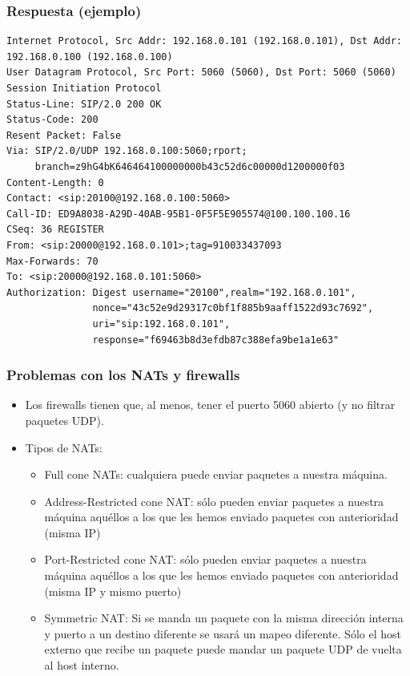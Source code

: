 \documentclass{beamer}
\begin{document}
\begin{frame}[fragile]
\frametitle{Respuesta (ejemplo)}

\begin{footnotesize}
\begin{verbatim}
Internet Protocol, Src Addr: 192.168.0.101 (192.168.0.101), Dst Addr:
192.168.0.100 (192.168.0.100)
User Datagram Protocol, Src Port: 5060 (5060), Dst Port: 5060 (5060)
Session Initiation Protocol
Status-Line: SIP/2.0 200 OK
Status-Code: 200
Resent Packet: False
Via: SIP/2.0/UDP 192.168.0.100:5060;rport;
     branch=z9hG4bK646464100000000b43c52d6c00000d1200000f03
Content-Length: 0
Contact: <sip:20100@192.168.0.100:5060>
Call-ID: ED9A8038-A29D-40AB-95B1-0F5F5E905574@100.100.100.16
CSeq: 36 REGISTER
From: <sip:20000@192.168.0.101>;tag=910033437093
Max-Forwards: 70
To: <sip:20000@192.168.0.101:5060>
Authorization: Digest username="20100",realm="192.168.0.101",
               nonce="43c52e9d29317c0bf1f885b9aaff1522d93c7692",
               uri="sip:192.168.0.101",
               response="f69463b8d3efdb87c388efa9be1a1e63"

\end{verbatim}
\end{footnotesize}

\end{frame}



\begin{frame}
\frametitle{Problemas con los NATs y firewalls}

\begin{itemize}
\item Los firewalls tienen que, al menos, tener el puerto 5060 abierto (y no filtrar paquetes UDP).
\item Tipos de NATs:
\begin{itemize}
  \item Full cone NATs: cualquiera puede enviar paquetes a nuestra máquina.
  \item Address-Restricted cone NAT: sólo pueden enviar paquetes a nuestra máquina aquéllos a los que les hemos enviado paquetes con anterioridad (misma IP)
  \item Port-Restricted cone NAT: sólo pueden enviar paquetes a nuestra máquina aquéllos a los que les hemos enviado paquetes con anterioridad (misma IP y mismo puerto)
  \item Symmetric NAT: Si se manda un paquete con la misma dirección interna y puerto a un destino diferente se usará un mapeo diferente. Sólo el host externo que recibe un paquete puede mandar un paquete UDP de vuelta al host interno.
\end{itemize}
\end{itemize}

\end{frame}
\end{document}

